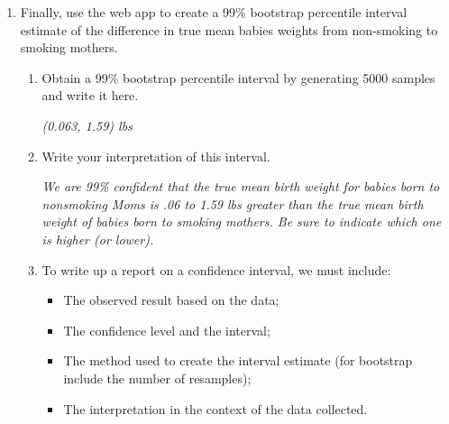 \begin{enumerate}
\item Finally, use the web app to create a 99\% bootstrap percentile
  interval estimate of the  difference in true mean babies weights
  from non-smoking to smoking mothers.  
  \begin{enumerate}

\item Obtain a 99\% bootstrap percentile interval by generating 5000
  samples and write it here.
\begin{students}
    \vspace{2cm}    
\end{students}

\begin{key}
  {\it (0.063, 1.59) lbs  }
\end{key}
    \item Write your interpretation of this interval.
\begin{students}
    \vfill
\end{students}

\begin{key}
  {\it  We are 99\% confident that the true mean birth weight for
    babies born to nonsmoking Moms is   .06 to 1.59 lbs greater than 
   the true mean birth weight of babies born to smoking mothers. Be
   sure to indicate which one is higher  (or lower). } 
\end{key}


\item To write up a report on a confidence interval, we must include:
  \begin{itemize}
  \item The observed result based on the data;
  \item The confidence level and the interval;
  \item The method used to create the interval estimate (for
        bootstrap include the number of resamples);
  \item The interpretation in the context of the data collected.
\end{itemize}
\end{enumerate}
\end{enumerate}

\begin{students}
  \newpage
\end{students}

